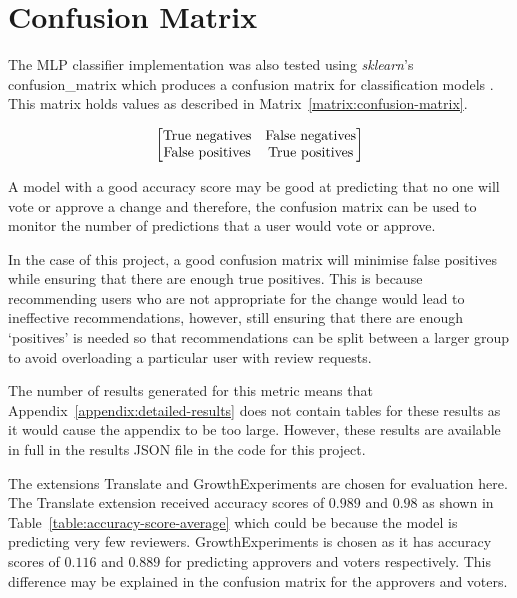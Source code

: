 \section{Confusion Matrix\label{section:confusion-matrix}}
The MLP classifier implementation was also tested using \emph{sklearn}'s confusion\_matrix which produces a confusion matrix for classification models \citep{sklearn:confusion-matrix}. This matrix holds values as described in Matrix~\ref{matrix:confusion-matrix}.

\begin{equation}
\begin{bmatrix}
$True negatives$ & $False negatives$ \\
$False positives$ & $True positives$
\end{bmatrix}
\label{matrix:confusion-matrix}
\end{equation}
\hspace{0.25cm}

A model with a good accuracy score may be good at predicting that no one will vote or approve a change and therefore, the confusion matrix can be used to monitor the number of predictions that a user would vote or approve.

In the case of this project, a good confusion matrix will minimise false positives while ensuring that there are enough true positives. This is because recommending users who are not appropriate for the change would lead to ineffective recommendations, however, still ensuring that there are enough `positives' is needed so that recommendations can be split between a larger group to avoid overloading a particular user with review requests.

The number of results generated for this metric means that Appendix~\ref{appendix:detailed-results} does not contain tables for these results as it would cause the appendix to be too large. However, these results are available in full in the results JSON file in the code for this project.

The extensions Translate and GrowthExperiments are chosen for evaluation here. The Translate extension received accuracy scores of \(0.989\) and \(0.98\) as shown in Table~\ref{table:accuracy-score-average} which could be because the model is predicting very few reviewers. GrowthExperiments is chosen as it has accuracy scores of \(0.116\) and \(0.889\) for predicting approvers and voters respectively. This difference may be explained in the confusion matrix for the approvers and voters.

